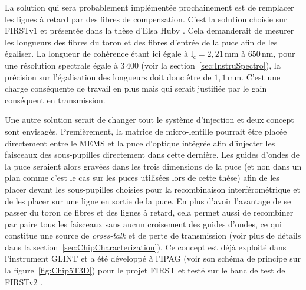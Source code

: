 La solution qui sera probablement implémentée prochainement est de remplacer les lignes à retard par des fibres de compensation. C'est la solution choisie sur \ac{FIRSTv1} et présentée dans la thèse d'Elsa Huby \citep{huby2013these}. Cela demanderait de mesurer les longueurs des fibres du toron et des fibres d'entrée de la puce afin de les égaliser. La longueur de cohérence étant ici égale à $\text{l}_\text{c} = 2,21 \,$mm à $650 \,$nm, pour une résolution spectrale égale à $3\,400$ (voir la section~\ref{sec:InstruSpectro}), la précision sur l'égalisation des longueurs doit donc être de $1,1 \,$mm. C'est une charge conséquente de travail en plus mais qui serait justifiée par le gain conséquent en transmission.

Une autre solution serait de changer tout le système d'injection et deux concept sont envisagés. Premièrement, la matrice de micro-lentille pourrait être placée directement entre le \ac{MEMS} et la puce d'optique intégrée afin d'injecter les faisceaux des sous-pupilles directement dans cette dernière. Les guides d'ondes de la puce seraient alors gravées dans les trois dimensions de la puce (et non dans un plan comme c'est le cas sur les puces utilisées lors de cette thèse) afin de les placer devant les sous-pupilles choisies pour la recombinaison interférométrique et de les placer sur une ligne en sortie de la puce. En plus d'avoir l'avantage de se passer du toron de fibres et des lignes à retard, cela permet aussi de recombiner par paire tous les faisceaux sans aucun croisement des guides d'ondes, ce qui constitue une source de \textit{cross-talk} et de perte de transmission (voir plus de détails dans la section~\ref{sec:ChipCharacterization}). Ce concept est déjà exploité dans l'instrument \ac{GLINT} \citep{martinod2021} et a été développé à l'\ac{IPAG} (voir son schéma de principe sur la figure~\ref{fig:Chip5T3D}) pour le projet \ac{FIRST} et testé sur le banc de test de \ac{FIRSTv2} \citep{martin2022a}.

